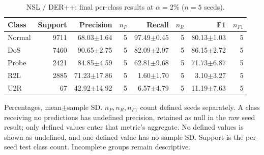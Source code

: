 \begin{table}[t]
\centering\scriptsize
\setlength{\tabcolsep}{3.3pt}
\caption{NSL / DER++: final per-class results at $\alpha=2\%$ ($n=5$ seeds).}\label{tab:forgetting-class-nsl_kdd-derpp}
\begin{tabular}{lrrrrrrr}
\toprule
Class & Support & Precision & $n_P$ & Recall & $n_R$ & F1 & $n_{F1}$ \\
\midrule
Normal & 9711 & 68.03$\pm$1.64 & 5 & 97.49$\pm$0.45 & 5 & 80.13$\pm$1.03 & 5 \\
DoS & 7460 & 90.65$\pm$2.75 & 5 & 82.09$\pm$2.97 & 5 & 86.15$\pm$2.72 & 5 \\
Probe & 2421 & 84.85$\pm$4.59 & 5 & 62.81$\pm$9.68 & 5 & 71.73$\pm$6.87 & 5 \\
R2L & 2885 & 71.23$\pm$17.86 & 5 & 1.60$\pm$1.70 & 5 & 3.10$\pm$3.27 & 5 \\
U2R & 67 & 42.92$\pm$14.92 & 5 & 6.57$\pm$4.79 & 5 & 11.19$\pm$7.63 & 5 \\
\bottomrule
\end{tabular}
\par\smallskip\begin{minipage}{0.98\textwidth}\scriptsize Percentages, mean$\pm$sample SD. $n_P,n_R,n_{F1}$ count defined seeds separately. A class receiving no predictions has undefined precision, retained as null in the raw seed result; only defined values enter that metric's aggregate. No defined values is shown as undefined, and one defined value has no sample SD. Support is the per-seed test class count. Incomplete groups remain descriptive.\end{minipage}
\end{table}

